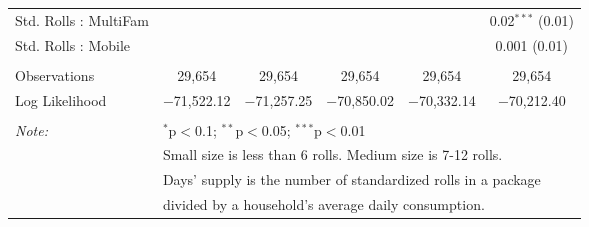 \begin{table}[!htbp]
\begin{tabular}{@{\extracolsep{5pt}}lccccc}
  Std. Rolls : MultiFam &  &  &  &  & 0.02$^{***}$ (0.01) \\ 
  Std. Rolls : Mobile &  &  &  &  & 0.001 (0.01) \\ 
 \hline \\[-1.8ex] 
Observations & 29,654 & 29,654 & 29,654 & 29,654 & 29,654 \\ 
Log Likelihood & $-$71,522.12 & $-$71,257.25 & $-$70,850.02 & $-$70,332.14 & $-$70,212.40 \\ 
\hline 
\hline \\[-1.8ex] 
\textit{Note:}  & \multicolumn{5}{l}{$^{*}$p$<$0.1; $^{**}$p$<$0.05; $^{***}$p$<$0.01} \\ 
 & \multicolumn{5}{l}{Small size is less than 6 rolls. Medium size is 7-12 rolls. } \\ 
 & \multicolumn{5}{l}{Days' supply is the number of standardized rolls in a package} \\ 
 & \multicolumn{5}{l}{divided by a household's average daily consumption.} \\ 
\end{tabular} 
\end{table} 
